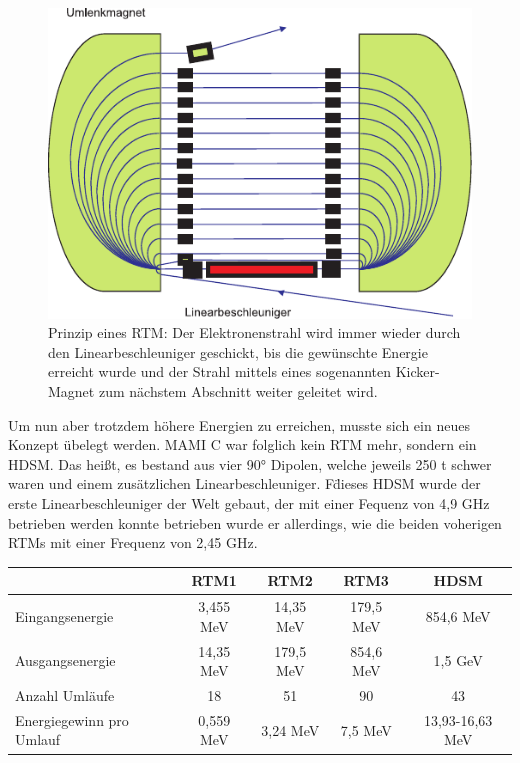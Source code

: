 \documentclass[a4paper,11pt,oneside,final,german,openbib,pdftex]{scrbook}
\begin{document}
{\begin{figure}[h!]
	\begin{center}
	\includegraphics{RTM}	
	\caption{Prinzip eines RTM: Der Elektronenstrahl wird immer wieder durch den Linearbeschleuniger geschickt, bis die gew\"unschte Energie erreicht wurde und der Strahl mittels eines sogenannten Kicker-Magnet zum n\"achstem Abschnitt weiter geleitet wird.\cite{KPh07} }
	\label{fig.RTM}
\end{center}
\end{figure}

Um nun aber trotzdem h\"ohere Energien zu erreichen, musste sich ein neues Konzept \"ubelegt werden. MAMI C war folglich kein RTM mehr, sondern ein HDSM. Das hei{\ss}t, es bestand aus vier 90° Dipolen, welche jeweils 250 t schwer waren und einem zus\"atzlichen Linearbeschleuniger. F\" dieses HDSM wurde der erste Linearbeschleuniger der Welt gebaut, der mit einer Fequenz von 4,9 GHz betrieben werden konnte betrieben wurde er allerdings, wie die beiden voherigen RTMs mit einer Frequenz von 2,45 GHz.
\newline
\begin{table}[h!]
	\begin{center}
		\begin{tabular}{|l|c|c|c|c|}
			\hline
			& RTM1 & RTM2 & RTM3 & HDSM \\
			\hline
			\hline
			Eingangsenergie &3,455 MeV  &  14,35 MeV& 179,5 MeV  &854,6 MeV \\ \hline
			Ausgangsenergie &14,35 MeV  &  179,5 MeV &854,6 MeV  & 1,5 GeV \\ \hline
			Anzahl Uml\"aufe&18  &51  &90  &43 \\ \hline
			Energiegewinn pro Umlauf &0,559 MeV  & 3,24 MeV & 7,5 MeV  & 13,93-16,63 MeV \\ \hline
			

\end{tabular}
\end{center}
\end{table}}
\end{document}
